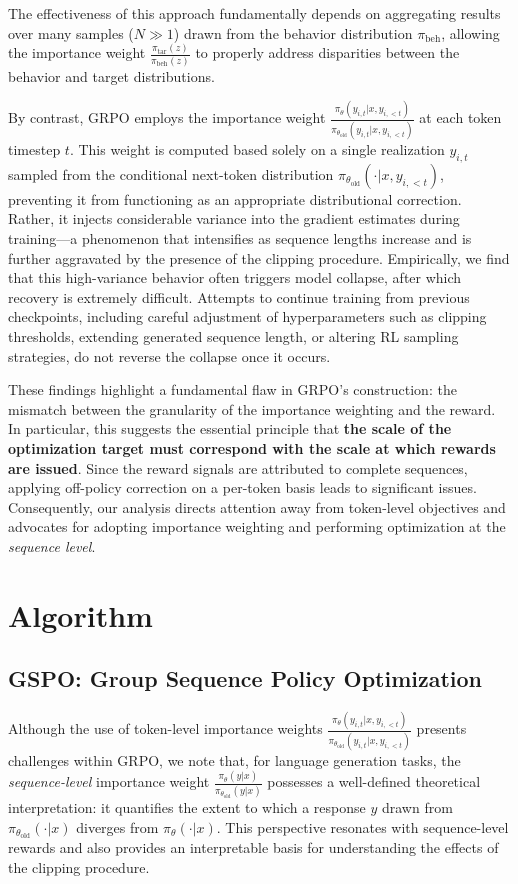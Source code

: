 The effectiveness of this approach fundamentally depends on aggregating results over many samples ($N \gg 1$) drawn from the behavior distribution $\pi_\text{beh}$, allowing the importance weight $\frac{ \pi_\text{tar} (z) }{ \pi_\text{beh} (z)}$ to properly address disparities between the behavior and target distributions.

By contrast, GRPO employs the importance weight $\frac{ \pi_{\theta} (y_{i,t} | x, y_{i,<t}) }{ \pi_{\theta_\text{old}} (y_{i,t} | x,y_{i,<t})}$ at each token timestep $t$. This weight is computed based solely on a single realization $y_{i,t}$ sampled from the conditional next-token distribution $\pi_{\theta_\text{old}}( \cdot | x, y_{i, <t})$, preventing it from functioning as an appropriate distributional correction. Rather, it injects considerable variance into the gradient estimates during training—a phenomenon that intensifies as sequence lengths increase and is further aggravated by the presence of the clipping procedure. Empirically, we find that this high-variance behavior often triggers model collapse, after which recovery is extremely difficult. Attempts to continue training from previous checkpoints, including careful adjustment of hyperparameters such as clipping thresholds, extending generated sequence length, or altering RL sampling strategies, do not reverse the collapse once it occurs.

These findings highlight a fundamental flaw in GRPO's construction: the mismatch between the granularity of the importance weighting and the reward. In particular, this suggests the essential principle that \textbf{the scale of the optimization target must correspond with the scale at which rewards are issued}. Since the reward signals are attributed to complete sequences, applying off-policy correction on a per-token basis leads to significant issues. Consequently, our analysis directs attention away from token-level objectives and advocates for adopting importance weighting and performing optimization at the \textit{sequence level}.

\section{Algorithm}

\subsection{GSPO: Group Sequence Policy Optimization}

Although the use of token-level importance weights $\frac{ \pi_{\theta} (y_{i,t} | x, y_{i,<t}) }{ \pi_{\theta_\text{old}} (y_{i,t} | x, y_{i,<t})}$ presents challenges within GRPO, we note that, for language generation tasks, the \textit{sequence-level} importance weight $\frac{ \pi_{\theta} (y | x) }{ \pi_{\theta_\text{old}} (y | x)}$ possesses a well-defined theoretical interpretation: it quantifies the extent to which a response $y$ drawn from $\pi_{\theta_\text{old}} (\cdot | x)$ diverges from $\pi_{\theta} (\cdot | x)$. This perspective resonates with sequence-level rewards and also provides an interpretable basis for understanding the effects of the clipping procedure.

